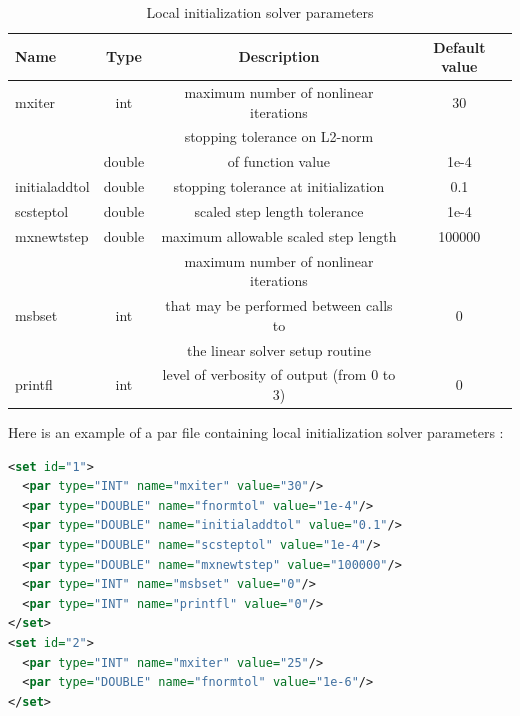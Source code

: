 \documentclass[a4paper, 12pt]{report}
\begin{document}
\begin{table}[H]
\center
\begin{tabular}{ l | c | c | c }
\toprule
\textbf{{Name}} & \textbf{{Type}} & \textbf{{Description}} & \textbf{{Default value}}\\
\midrule
\rowcolor{white}
\small{mxiter} & \small{int} & \small{maximum number of nonlinear iterations} & \small{30} \\
\rowcolor{gray!10}
 &  & \small{stopping tolerance on L2-norm} &  \\
\rowcolor{gray!10}
\multirow{-2}{*}{\small{fnormtol}} & \multirow{-2}{*}{\small{double}} & \small{of function value} & \multirow{-2}{*}{\small{1e-4}} \\
\rowcolor{white}
\small{initialaddtol} & \small{double} & \small{stopping tolerance at initialization} & \small{0.1} \\
\rowcolor{gray!10}
\small{scsteptol} & \small{double} & \small{scaled step length tolerance} & \small{1e-4} \\
\rowcolor{white}
\small{mxnewtstep} & \small{double} & \small{maximum allowable scaled step length} & \small{100000} \\
\rowcolor{gray!10}
 &  & \small{maximum number of nonlinear iterations} &  \\
\rowcolor{gray!10}
\small{msbset} & \small{int} & \small{that may be performed between calls to} & \small{0} \\
\rowcolor{gray!10}
 &  & \small{the linear solver setup routine} &  \\
 \rowcolor{gray!10}
\rowcolor{white}
\small{printfl} & \small{int} & \small{level of verbosity of output (from 0 to 3)} & \small{0} \\
\bottomrule
\end{tabular}
\caption{Local initialization solver parameters}
\end{table}

Here is an example of a par file containing local initialization solver parameters :

\begin{lstlisting}[language=XML]
<set id="1">
  <par type="INT" name="mxiter" value="30"/>
  <par type="DOUBLE" name="fnormtol" value="1e-4"/>
  <par type="DOUBLE" name="initialaddtol" value="0.1"/>
  <par type="DOUBLE" name="scsteptol" value="1e-4"/>
  <par type="DOUBLE" name="mxnewtstep" value="100000"/>
  <par type="INT" name="msbset" value="0"/>
  <par type="INT" name="printfl" value="0"/>
</set>
<set id="2">
  <par type="INT" name="mxiter" value="25"/>
  <par type="DOUBLE" name="fnormtol" value="1e-6"/>
</set>
\end{lstlisting}
\end{document}
